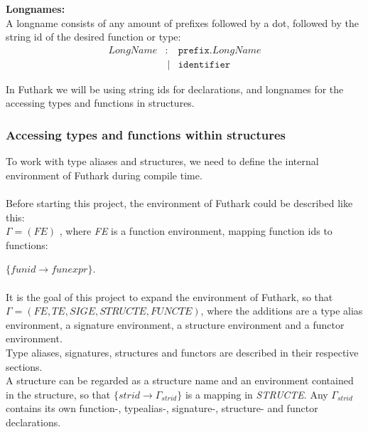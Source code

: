 \begin{tcolorbox}
\textbf{Longnames:}\\
A longname consists of any amount of prefixes followed by a dot, followed by the
string id of the desired function or type:
\begin{align*}
LongName & :  & \texttt{prefix.}LongName \\
         &\ | & \texttt{identifier}
\end{align*}

In Futhark we will be using string ids for declarations, and longnames for
the accessing types and functions in structures.


\end{tcolorbox}
\subsubsection{Accessing types and functions within structures}
To work with type aliases and structures, we need to define the internal
environment of Futhark during compile time.\\
\\
Before starting this project, the environment of Futhark could be described like
this:\\
$\Gamma = (FE)$ , where \textit{FE} is a function environment, mapping function ids to functions:

 $\{funid \to funexpr\}$.
\\\\
It is the goal of this project to expand the environment of Futhark, so that\\[0.2em]
$\Gamma = (FE, TE, SIGE, STRUCTE, FUNCTE)$, where the additions are a type alias environment, a signature environment, a structure environment and a functor environment.\\[0.2em]
Type aliases, signatures, structures and functors are described in their respective
sections.\\
A structure can be regarded as a structure name and an environment contained in the structure, so that
$\{strid \to \Gamma_{strid}\}$ is a mapping in \textit{STRUCTE}.
Any $\Gamma_{strid}$ contains its own function-, typealias-, signature-, structure- and functor declarations.\\
\\


